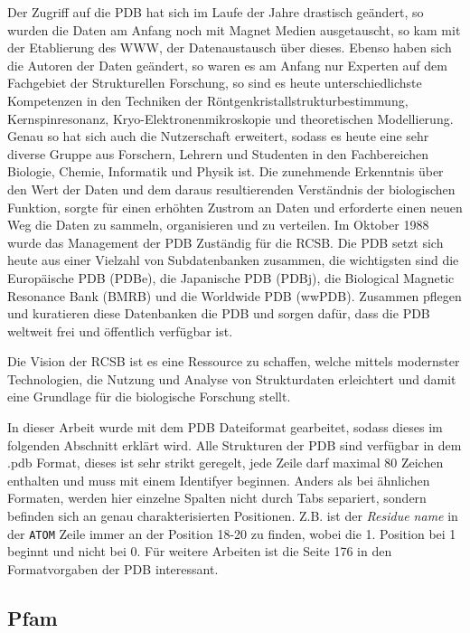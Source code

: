 Der Zugriff auf die \ac{PDB} hat sich im Laufe der Jahre drastisch geändert, so wurden die Daten am Anfang noch mit Magnet Medien ausgetauscht, so kam mit der Etablierung des WWW, der Datenaustausch über dieses. Ebenso haben sich die Autoren der Daten geändert, so waren es am Anfang nur Experten auf dem Fachgebiet der Strukturellen Forschung, so sind es heute unterschiedlichste Kompetenzen in den Techniken der Röntgenkristallstrukturbestimmung, Kernspinresonanz, Kryo-Elektronenmikroskopie und theoretischen Modellierung. Genau so hat sich auch die Nutzerschaft erweitert, sodass es heute eine sehr diverse Gruppe aus Forschern, Lehrern und Studenten in den Fachbereichen Biologie, Chemie, Informatik und Physik ist. Die zunehmende Erkenntnis über den Wert der Daten und dem daraus resultierenden Verständnis der biologischen Funktion, sorgte für einen erhöhten Zustrom an Daten und erforderte einen neuen Weg die Daten zu sammeln, organisieren und zu verteilen. Im Oktober 1988 wurde das Management der \ac{PDB} Zuständig für die \ac{RCSB}. Die \ac{PDB} setzt sich heute aus einer Vielzahl von Subdatenbanken zusammen, die wichtigsten sind die Europäische \ac{PDB} (PDBe), die Japanische \ac{PDB} (PDBj), die Biological Magnetic Resonance Bank (BMRB) und die Worldwide \ac{PDB} (wwPDB). Zusammen pflegen und kuratieren diese Datenbanken die \ac{PDB} und sorgen dafür, dass die \ac{PDB} weltweit frei und öffentlich verfügbar ist.

Die Vision der RCSB ist es eine Ressource zu schaffen, welche mittels modernster Technologien, die Nutzung und Analyse von Strukturdaten erleichtert und damit eine Grundlage für die biologische Forschung stellt. 

In dieser Arbeit wurde mit dem \ac{PDB} Dateiformat gearbeitet, sodass dieses im folgenden Abschnitt erklärt wird. Alle Strukturen der \ac{PDB} sind verfügbar in dem .pdb Format, dieses ist sehr strikt geregelt, jede Zeile darf maximal 80 Zeichen enthalten und muss mit einem Identifyer beginnen. Anders als bei ähnlichen Formaten, werden hier einzelne Spalten nicht durch Tabs separiert, sondern befinden sich an genau charakterisierten Positionen. Z.B. ist der \emph{Residue name} in der \texttt{ATOM} Zeile immer an der Position 18-20 zu finden, wobei die 1. Position bei 1 beginnt und nicht bei 0. Für weitere Arbeiten ist die Seite 176 in den Formatvorgaben der \ac{PDB} interessant.


\subsection{Pfam}

